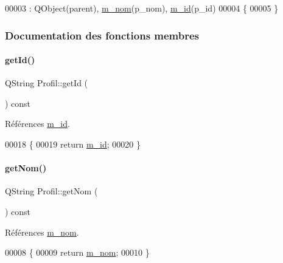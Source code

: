 \begin{DoxyCode}
00003                                                            : QObject(parent), 
      \hyperlink{class_profil_a5159c0fa27b964d20813a51a56cab0dc}{m\_nom}(p\_nom), \hyperlink{class_profil_a181301ab1db188efb1e7c1574f6be917}{m\_id}(p\_id)
00004 \{
00005 \}
\end{DoxyCode}


\subsubsection{Documentation des fonctions membres}
\mbox{\label{class_profil_ab6281942d5ebe10cb3b38589fc353ff6}} 
\paragraph{\texorpdfstring{get\+Id()}{getId()}}
{\footnotesize\ttfamily Q\+String Profil\+::get\+Id (\begin{DoxyParamCaption}{ }\end{DoxyParamCaption}) const}



Références \hyperlink{class_profil_a181301ab1db188efb1e7c1574f6be917}{m\+\_\+id}.


\begin{DoxyCode}
00018 \{
00019     \textcolor{keywordflow}{return} \hyperlink{class_profil_a181301ab1db188efb1e7c1574f6be917}{m\_id};
00020 \}
\end{DoxyCode}
\mbox{\label{class_profil_aac46cc403319711f8ed5aef3fc1d0011}} 
\paragraph{\texorpdfstring{get\+Nom()}{getNom()}}
{\footnotesize\ttfamily Q\+String Profil\+::get\+Nom (\begin{DoxyParamCaption}{ }\end{DoxyParamCaption}) const}



Références \hyperlink{class_profil_a5159c0fa27b964d20813a51a56cab0dc}{m\+\_\+nom}.


\begin{DoxyCode}
00008 \{
00009     \textcolor{keywordflow}{return} \hyperlink{class_profil_a5159c0fa27b964d20813a51a56cab0dc}{m\_nom};
00010 \}
\end{DoxyCode}
\mbox{\label{class_profil_a0d67f046b27cfa936590d72a3fef82aa}} 
